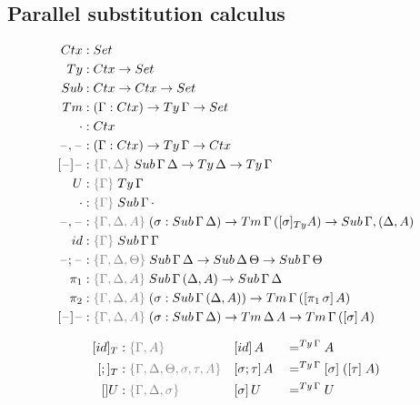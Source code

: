 \documentclass[a4paper,UKenglish,numberwithinsect,cleveref,thm-restate]{lipics-v2021}
\begin{document}
\subsection{Parallel substitution calculus} \label{subsec:SC}
\begin{alignat*}{3}
  \Ctx   & : \Set                   \\
  \Ty    & : \Ctx \to \Set          \\
  \Sub   & : \Ctx \to \Ctx \to \Set \\
  \Tm    & : (\Gamma : \Ctx) \to \Ty\,\Gamma \to \Set \\
  \emptyctx & : \Ctx \\
  \blank,\blank & : (\Gamma : \Ctx) \to \Ty\,\Gamma \to \Ctx \\
  [\blank]\blank &: \implicit{\Gamma, \Delta} \; \Sub\,\Gamma\,\Delta \to \Ty\,\Delta \to \Ty\,\Gamma \\
  U & : \implicit{\Gamma}\;\Ty\, \Gamma\\
  \emptysub & : \implicit{\Gamma}\;\Sub\,\Gamma\,\emptyctx \\
  \blank,\blank & : \implicit{\Gamma, \Delta, A}\;(\sigma : \Sub\,\Gamma\,\Delta) \to \Tm\,\Gamma\,([ \sigma ]_{\Ty} A) \to \Sub\,\Gamma,(\Delta, A) \\
  \idS & : \implicit{\Gamma}\;\Sub\,\Gamma\,\Gamma \\
  \blank;\blank & : \implicit{\Gamma, \Delta, \Theta}\;\Sub\,\Gamma\,\Delta \to \Sub\,\Delta\,\Theta \to \Sub\,\Gamma\,\Theta \\
  \pi_1 & : \implicit{\Gamma, \Delta, A}\;\Sub\,\Gamma\,(\Delta, A) \to \Sub\,\Gamma\,\Delta \\
  \pi_2 & : \implicit{\Gamma, \Delta, A}\;(\sigma : \Sub\,\Gamma\,(\Delta, A)) \to \Tm\,\Gamma\,([ \pi_1\,\sigma ]\, A) \\
  [\blank] \blank & : \implicit{\Gamma,\Delta, A}\;(\sigma : \Sub\,\Gamma\,\Delta) \to \Tm\,\Delta\,A \to \Tm\,\Gamma\,([\sigma]\, A)
\end{alignat*}


\begin{alignat*}{3}
  [\idS]_T & : \implicit{\Gamma, A}                               && [ \idS ] \,A         && =^{\Ty\,\Gamma} A \\
  [;]_T    & : \implicit{\Gamma, \Delta, \Theta, \sigma, \tau, A} && [ \sigma ; \tau ]\,A && =^{\Ty\,\Gamma} [ \sigma ]\;([ \tau ]\;A) \\
  []U      & : \implicit{\Gamma, \Delta, \sigma}                  && [ \sigma ]\,U        && =^{\Ty\,\Gamma} U
\end{alignat*}
\end{document}
